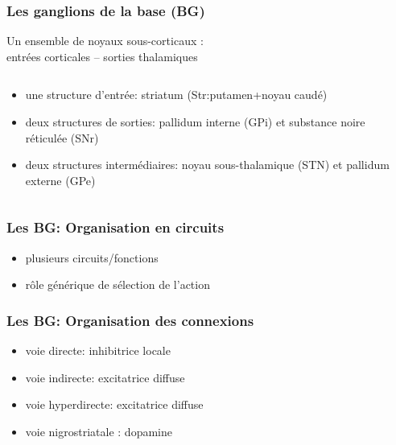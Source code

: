 \documentclass[10pt]{beamer}
\begin{document}
\begin{frame}
  \frametitle{Les ganglions de la base (BG)}
Un ensemble de noyaux sous-corticaux : \\entr\'ees {\color{myblue}corticales} -- sorties {\color{myblue}thalamiques}
\begin{columns}
\begin{column}{0.5\textwidth}

\begin{itemize}
\item une structure d'entr\'ee: striatum ({\color{myblue}Str}:putamen+noyau caud\'e)
\item deux structures de sorties: pallidum interne ({\color{myblue}GPi}) et substance noire r\'eticul\'ee ({\color{myblue}SNr})
\item deux structures interm\'ediaires: noyau sous-thalamique ({\color{myblue}STN}) et pallidum externe ({\color{myblue}GPe})
\end{itemize}
\end{column}
\begin{column}{0.6\textwidth}
\end{column}
\end{columns}
\end{frame}

\begin{frame}
  \frametitle{Les BG: Organisation en circuits}

\begin{itemize}
\item plusieurs circuits/fonctions
\item r\^ole g\'en\'erique de s\'election de l'action
\end{itemize}
\end{frame}

\begin{frame}
  \frametitle{Les BG: Organisation des connexions}
\begin{itemize}
\item voie directe: {\color{blue}inhibitrice} locale 
\item voie indirecte: {\color{red}excitatrice} diffuse
\item voie hyperdirecte: {\color{red}excitatrice} diffuse
\item voie nigrostriatale : {\color{green}dopamine}
\end{itemize}
\end{frame}
\end{document}
